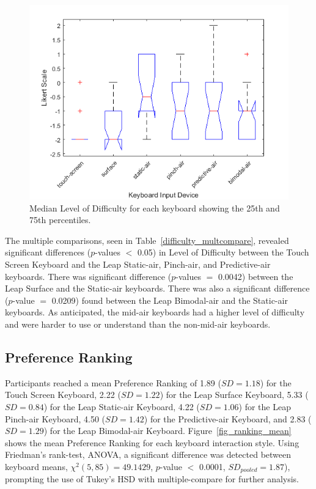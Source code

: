 \begin{figure}[!t]
	\centering
	\includegraphics{Figures/fig_difficulty_boxplot}
	\caption[Level of Difficulty Boxplot]{Median Level of Difficulty for each keyboard showing the 25th and 75th percentiles.}
	\label{fig_difficulty_boxplot}
\end{figure}

The multiple comparisons, seen in Table~\ref{difficulty_multcompare}, revealed significant differences ($p$-values $<$ 0.05) in Level of Difficulty between the Touch Screen Keyboard and the Leap Static-air, Pinch-air, and Predictive-air keyboards. There was significant difference ($p$-values $=$ 0.0042) between the Leap Surface and the Static-air keyboards. There was also a significant difference ($p$-value $=$ 0.0209) found between the Leap Bimodal-air and the Static-air keyboards. As anticipated, the mid-air keyboards had a higher level of difficulty and were harder to use or understand than the non-mid-air keyboards.

\subsection{Preference Ranking}
Participants reached a mean Preference Ranking of 1.89 ($SD = 1.18$) for the Touch Screen Keyboard, 2.22 ($SD = 1.22$) for the Leap Surface Keyboard, 5.33 ($SD = 0.84$) for the Leap Static-air Keyboard, 4.22 ($SD = 1.06$) for the Leap Pinch-air Keyboard, 4.50 ($SD = 1.42$) for the Predictive-air Keyboard, and 2.83 ($SD = 1.29$) for the Leap Bimodal-air Keyboard. Figure~\ref{fig_ranking_mean} shows the mean Preference Ranking for each keyboard interaction style. Using Friedman's rank-test, ANOVA, a significant difference was detected between keyboard means, $\chi^{2}(5, 85) = 49.1429$, $p$-value $<$ 0.0001, $SD_{pooled} = 1.87$), prompting the use of Tukey's HSD with multiple-compare for further analysis.

